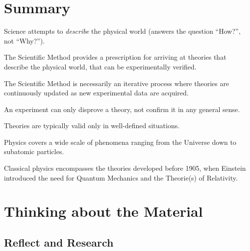 \newpage
\section{Summary}
\vspace{2cm}
\begin{chapterSummary}
\item Science attempts to \textit{describe} the physical world (answers the question ``How?'', not ``Why?'').
\item The Scientific Method provides a prescription for arriving at theories that describe the physical world, that can be 
experimentally verified.
\item The Scientific Method is necessarily an iterative process where theories are continuously updated as new experimental data are acquired.
\item An experiment can only disprove a theory, not confirm it in any general sense.
\item Theories are typically valid only in well-defined situations.
\item Physics covers a wide scale of phenomena ranging from the Universe down to subatomic particles.
\item Classical physics encompasses the theories developed before 1905, when Einstein introduced the need for Quantum Mechanics and the Theorie(s) of Relativity.
\end{chapterSummary}

\section{Thinking about the Material}

\subsection{Reflect and Research}

